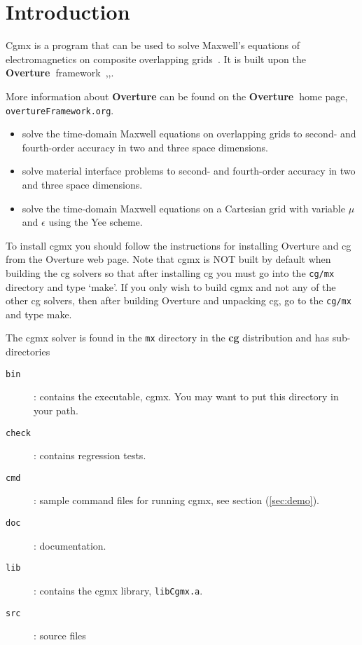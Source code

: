 \documentclass{article}
\newcommand{\Overture}{{\bf Overture\ }}
\begin{document}
\clearpage
\tableofcontents


\vfill\eject

\section{Introduction}

   Cgmx is a program that can be used to solve Maxwell's equations of electromagnetics 
on composite overlapping grids~\cite{max2006b}. It is built upon
the \Overture framework~\cite{Brown97},\cite{Henshaw96a},\cite{iscope97}.

More information about
{\bf Overture} can be found on the \Overture home page, {\tt overtureFramework.org}.



\begin{itemize}
  \item solve the time-domain Maxwell equations on overlapping grids to second- and fourth-order accuracy in two and three space dimensions. 
  \item solve material interface problems to second- and fourth-order accuracy in two and three space dimensions. 
  \item solve the time-domain Maxwell equations on a Cartesian grid with variable $\mu$ and $\epsilon$ using the Yee scheme.
\end{itemize}


 To install cgmx you should follow the instructions for installing Overture and cg
from the Overture web page. Note that cgmx is NOT built by default when building the cg solvers so that
after installing cg you must go into the {\tt cg/mx} directory and type `make'. 
If you only wish to build cgmx and not any of the other cg solvers, then
after building Overture and unpacking cg, go to the {\tt cg/mx} and type make. 

\noindent The cgmx solver is found in the {\tt mx} directory in the {\bf cg} distribution and has
sub-directories
\begin{description}
 \item[{\tt bin}] : contains the executable, cgmx. You may want to put this directory in your path.
 \item[{\tt check}] : contains regression tests.
 \item[{\tt cmd}] : sample command files for running cgmx, see section (\ref{sec:demo}).
 \item[{\tt doc}] : documentation.
 \item[{\tt lib}] : contains the cgmx library, {\tt libCgmx.a}.
 \item[{\tt src}] : source files 
\end{description}
\end{document}

